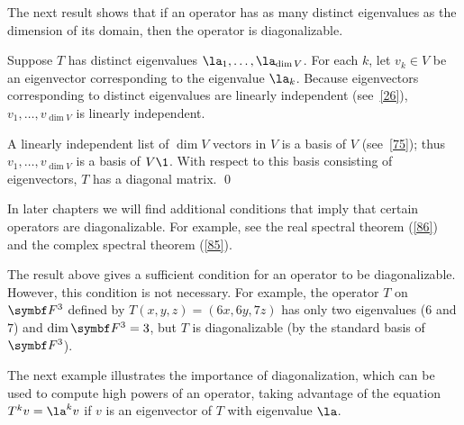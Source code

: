 The next result shows that if an operator has as many distinct
eigenvalues as the dimension of its domain, then the operator is diagonalizable.


\proof
Suppose $T$ has distinct eigenvalues $\la_1, \dots, \la_{\dim V}$.  For each $k$, let $v_k \in V$ be an
eigenvector corresponding to the eigenvalue $\la_k$.  Because eigenvectors corresponding to distinct eigenvalues are linearly
independent (see~\ref{26}), $v_1, \dots, v_{\dim V}$ is linearly independent.

A linearly independent list of $\dim V$ vectors in $V$ is a basis of $V$ (see~\ref{75}); thus $v_1, \dots, v_{\dim V}$ is a basis of $V\1$.  With respect to this basis consisting of eigenvectors, $T$ has a diagonal matrix.
\qed

In later chapters we will find additional conditions that imply that certain
operators are diagonalizable. For example, see the real spectral theorem (\ref{86}) and the complex spectral theorem (\ref{85}).

The result above gives a sufficient condition for an operator to be diagonalizable. However, this condition is not necessary. For example, the operator $T$ on $\F3$ defined by $T(x,y,z) = (6x, 6y, 7z)$ has only two eigenvalues ($6$ and $7$) and $\dim \F3 = 3$, but $T$ is diagonalizable \big(by the standard basis of $\F3$\big).

\pagebreak[3]


The next example illustrates the importance of diagonalization, which can be used to compute high powers of an operator, taking advantage of the equation $T^k v = \la^k v$ if $v$ is an eigenvector of $T$ with eigenvalue $\la$.

